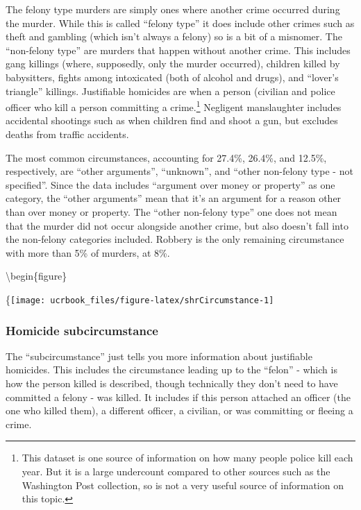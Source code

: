 \documentclass[
  12pt,
  openany]{book}
\begin{document}
The felony type murders are simply ones where another crime occurred during the murder. While this is called ``felony type'' it does include other crimes such as theft and gambling (which isn't always a felony) so is a bit of a misnomer. The ``non-felony type'' are murders that happen without another crime. This includes gang killings (where, supposedly, only the murder occurred), children killed by babysitters, fights among intoxicated (both of alcohol and drugs), and ``lover's triangle'' killings. Justifiable homicides are when a person (civilian and police officer who kill a person committing a crime.\footnote{This dataset is one source of information on how many people police kill each year. But it is a large undercount compared to other sources such as the Washington Post collection, so is not a very useful source of information on this topic.} Negligent manslaughter includes accidental shootings such as when children find and shoot a gun, but excludes deaths from traffic accidents.

The most common circumstances, accounting for 27.4\%, 26.4\%, and 12.5\%, respectively, are ``other arguments'', ``unknown'', and ``other non-felony type - not specified''. Since the data includes ``argument over money or property'' as one category, the ``other arguments'' mean that it's an argument for a reason other than over money or property. The ``other non-felony type'' one does not mean that the murder did not occur alongside another crime, but also doesn't fall into the non-felony categories included. Robbery is the only remaining circumstance with more than 5\% of murders, at 8\%.

\textbackslash begin\{figure\}

\{\centering \texttt{[image: ucrbook\_files/figure-latex/shrCircumstance-1]}

\hypertarget{homicide-subcircumstance}{%
\subsubsection{Homicide subcircumstance}\label{homicide-subcircumstance}}

The ``subcircumstance'' just tells you more information about justifiable homicides. This includes the circumstance leading up to the ``felon'' - which is how the person killed is described, though technically they don't need to have committed a felony - was killed. It includes if this person attached an officer (the one who killed them), a different officer, a civilian, or was committing or fleeing a crime.
\end{document}

